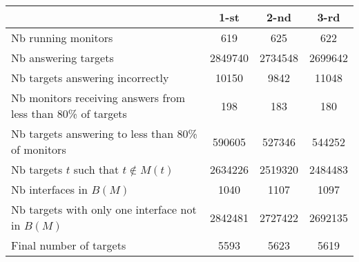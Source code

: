 \begin{tabular}{ | p{} | c | c | c | }
    \cline{2-4}
    \multicolumn{1}{c|}{} & 1-st & 2-nd & 3-rd \\
    \hline
    Nb running monitors  & 619 & 625 & 622 \\
    Nb answering targets & 2849740 & 2734548 & 2699642 \\
    Nb targets answering incorrectly & 10150 & 9842 & 11048 \\
    Nb monitors receiving answers from less than 80\% of targets & 198 & 183 & 180 \\
    Nb targets answering to less than 80\% of monitors& 590605 & 527346 & 544252 \\
    Nb targets $t$ such that $t \not\in M(t)$ & 2634226 & 2519320 & 2484483 \\
    Nb interfaces in $B(M)$ & 1040 & 1107 & 1097 \\
    Nb targets with only one interface not in $B(M)$ & 2842481 & 2727422 & 2692135
    \\
    Final number of targets & 5593 & 5623 & 5619 \\
    \hline
\end{tabular}
